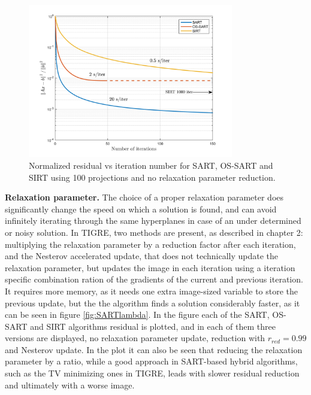 \begin{figure}[H]
\begin{center}

\includegraphics[width=0.8\textwidth]{Applications/SARTtypes.png} 
\end{center}

\caption[Nomralized residual vs iteration of SART/OS-SART/SIRT]{\label{fig:SARTtypesconv} Normalized residual vs iteration number for SART, OS-SART and SIRT using 100 projections and no relaxation parameter reduction.} 
\end{figure}

\textbf{Relaxation parameter.} The choice of a proper relaxation parameter does significantly change the speed on which a solution is found, and can avoid infinitely iterating through the same hyperplanes in case of an under determined or noisy solution. In TIGRE, two methods are present, as described in chapter 2: multiplying the relaxation parameter by a reduction factor after each iteration, and the Nesterov accelerated update, that does not technically update the relaxation parameter, but updates the image in each iteration using a iteration specific combination ration of the gradients of the current and previous iteration. It requires more memory, as it needs one extra image-sized variable to store the previous update, but the the algorithm finds a solution considerably faster, as it can be seen in figure \ref{fig:SARTlambda}. In the figure each of the SART, OS-SART and SIRT algorithms residual is plotted, and in each of them three versions are displayed, no relaxation parameter update, reduction with $r_{red}=0.99$ and Nesterov update. In the plot it can also be seen that reducing the relaxation parameter by a ratio, while a good approach in SART-based hybrid algorithms, such as the TV minimizing ones in TIGRE, leads with slower residual reduction and ultimately with a worse image.

